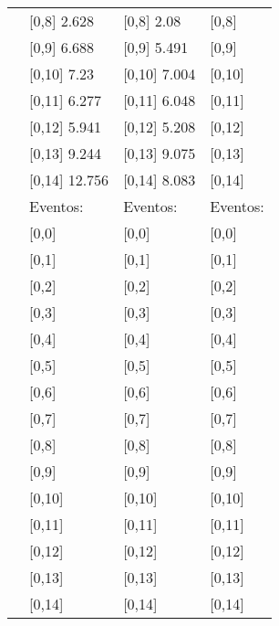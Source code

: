 \begin{table}
\begin{tabular}[t]{llll}
\addlinespace
 & {}[0,8] 2.628 & {}[0,8] 2.08 & {}[0,8]\\
 & {}[0,9] 6.688 & {}[0,9] 5.491 & {}[0,9]\\
 & {}[0,10] 7.23 & {}[0,10] 7.004 & {}[0,10]\\
 & {}[0,11] 6.277 & {}[0,11] 6.048 & {}[0,11]\\
 & {}[0,12] 5.941 & {}[0,12] 5.208 & {}[0,12]\\
\addlinespace
 & {}[0,13] 9.244 & {}[0,13] 9.075 & {}[0,13]\\
 & {}[0,14] 12.756 & {}[0,14] 8.083 & {}[0,14]\\
 & Eventos: & Eventos: & Eventos:\\
 & {}[0,0] & {}[0,0] & {}[0,0]\\
 & {}[0,1] & {}[0,1] & {}[0,1]\\
\addlinespace
 & {}[0,2] & {}[0,2] & {}[0,2]\\
 & {}[0,3] & {}[0,3] & {}[0,3]\\
 & {}[0,4] & {}[0,4] & {}[0,4]\\
 & {}[0,5] & {}[0,5] & {}[0,5]\\
 & {}[0,6] & {}[0,6] & {}[0,6]\\
\addlinespace
1000 & {}[0,7] & {}[0,7] & {}[0,7]\\
 & {}[0,8] & {}[0,8] & {}[0,8]\\
 & {}[0,9] & {}[0,9] & {}[0,9]\\
 & {}[0,10] & {}[0,10] & {}[0,10]\\
 & {}[0,11] & {}[0,11] & {}[0,11]\\
\addlinespace
 & {}[0,12] & {}[0,12] & {}[0,12]\\
 & {}[0,13] & {}[0,13] & {}[0,13]\\
 & {}[0,14] & {}[0,14] & {}[0,14]\\
\bottomrule
\end{tabular}
\end{table}
